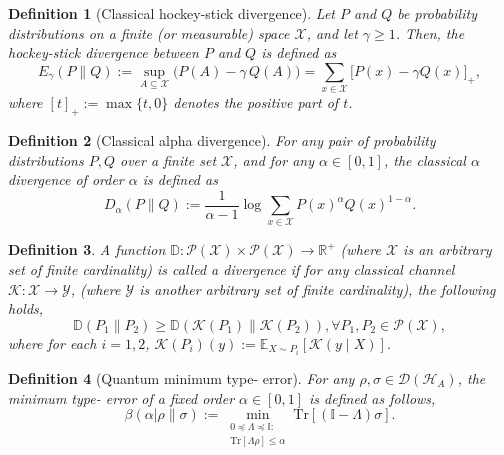 \documentclass[onecolumn,ldraftcls, 11pt]{IEEEtran}
\newcommand{\RNum}[1]{\uppercase\expandafter{\romannumeral #1\relax}}
\newcommand{\tr}{\mathrm{Tr}}
\newcommand*{\bbR}{\mathbb{R}}
\newcommand*{\bbD}{\mathbb{D}}
\newcommand*{\bbI}{\mathbb{I}}
\newcommand*{\bbE}{\mathbb{E}}
\newcommand*{\cP}{\mathcal{P}}
\newcommand*{\cH}{\mathcal{H}}
\newcommand*{\cD}{\mathcal{D}}
\newcommand*{\cK}{\mathcal{K}}
\newcommand*{\cX}{\mathcal{X}}
\newcommand*{\cY}{\mathcal{Y}}
\newtheorem{definition}{Definition}
\begin{document}
\begin{definition}[Classical hockey-stick divergence{\cite{Hull2003}}]\label{def_class_hockey_stick}
Let $P$ and $Q$ be probability distributions on a finite (or measurable) space $\mathcal{X}$, and let $\gamma \geq 1$.  
Then, the hockey-stick divergence between $P$ and $Q$ is defined as
\[
  E_{\gamma}(P \| Q)
  := \sup_{A \subseteq \mathcal{X}} \Big( P(A) - \gamma \, Q(A) \Big)
  = \sum_{x \in \mathcal{X}} \big[ P(x) - \gamma Q(x) \big]_+ ,
\]
where $[t]_+ := \max\{t,0\}$ denotes the positive part of $t$.
\end{definition}

\begin{definition}[Classical alpha divergence]\label{def_c-alpha_div}
    For any pair of probability distributions $P,Q$ over a finite set $\cX$, and for any $\alpha \in [0,1]$, the classical $\alpha$ divergence of order $\alpha$ is defined as
    \begin{equation}
        D_{\alpha}(P\|Q) := 
        \frac{1}{\alpha-1} \log \sum_{x \in \cX} P(x)^\alpha Q(x)^{1-\alpha}.
    \end{equation}
\end{definition}

\begin{definition}\label{def_data_proc_div_class}
    A function $\bbD : \cP(\cX) \times \cP(\cX) \to \bbR^{+}$ (where $\cX$ is an arbitrary set of finite cardinality) is called a divergence if for  
    any classical channel $\cK: \cX \to \cY$, (where $\cY$ is another arbitrary set of finite cardinality), the following holds,
    \begin{equation}
       \bbD(P_1\|P_2) \geq  \bbD(\cK(P_1)\|
       \cK(P_2)), \forall P_1,P_2 \in \cP(\cX),\label{def_data_proc_div_class_eq}
    \end{equation}
    where for each $i = 1,2$, $\cK(P_i)(y) := \bbE_{X \sim P_i} \left[\cK(y\mid X)\right]$.
\end{definition}



\begin{definition}[Quantum minimum type-\RNum{2} error]\label{Q-def_min_type2_err}
    For any $\rho,\sigma \in \cD(\cH_A)$, 
    the minimum type-\RNum{2} error of a fixed order $\alpha \in [0,1]$ is defined as follows,
    \begin{equation}
        \beta(\alpha|\rho\|\sigma) := 
        \min_{\substack{0 \preceq \Lambda \preceq \bbI:\\
        \tr[\Lambda \rho] \leq \alpha}} 
        \tr[(\bbI - \Lambda)\sigma] .\label{Qdef_min_type2_err_eq}
    \end{equation}
\end{definition}
\end{document}
